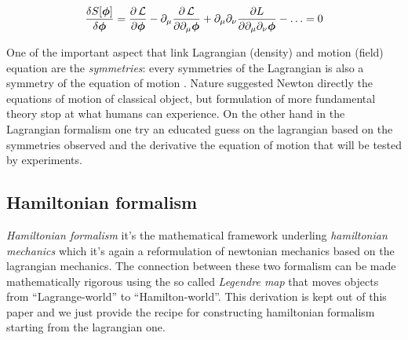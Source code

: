 \begin{equation} \label{eq:euler-lagrange-field}
  \frac{\delta S[\bm{\phi}]}{\delta \bm{\phi}} =
    \frac{\partial \operatorname{\mathcal{L}}}{\partial \bm{\phi}} -
    \partial_{\mu} \frac{\partial \operatorname{\mathcal{L}}}{\partial \partial_{\mu}\bm{\phi}} +
    \partial_{\mu}\partial_{\nu}\frac{\partial L}
    {\partial \partial_{\mu}\partial_{\nu}\bm{\phi}} -
    \ldots = 0
\end{equation}

One of the important aspect that link Lagrangian (density) and motion (field)
equation are the \emph{symmetries}: every symmetries of the Lagrangian is also a
symmetry of the equation of motion \cite{Aldrovandi19_symmetry}. Nature
suggested Newton directly the equations of motion of classical object, but
formulation of more fundamental theory stop at what humans can experience. On
the other hand in the Lagrangian formalism one try an educated guess on the
lagrangian based on the symmetries observed and the derivative the equation of
motion that will be tested by experiments.


\subsection{Hamiltonian formalism} \label{subsection: hamiltonian_formalism}
\emph{Hamiltonian formalism} it's the mathematical framework underling
\emph{hamiltonian mechanics} which it's again a reformulation of newtonian
mechanics based on the lagrangian mechanics. The connection between these two
formalism can be made mathematically rigorous using the so called \emph{Legendre
map} that moves objects from ``Lagrange-world'' to ``Hamilton-world''. This
derivation is kept out of this paper and we just provide the recipe for
constructing hamiltonian formalism starting from the lagrangian one.

